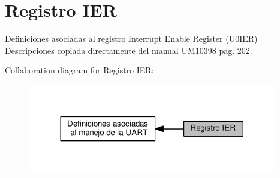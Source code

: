 \hypertarget{group___r_e_g_i_s_t_r_o___i_e_r}{}\section{Registro I\+ER}
\label{group___r_e_g_i_s_t_r_o___i_e_r}


Definiciones asociadas al registro Interrupt Enable Register (U0\+I\+ER)~\newline
 Descripciones copiada directamente del manual U\+M10398 pag. 202.  


Collaboration diagram for Registro I\+ER\+:\nopagebreak
\begin{figure}[H]
\begin{center}
\leavevmode
\includegraphics[width=308pt]{group___r_e_g_i_s_t_r_o___i_e_r}
\end{center}
\end{figure}
